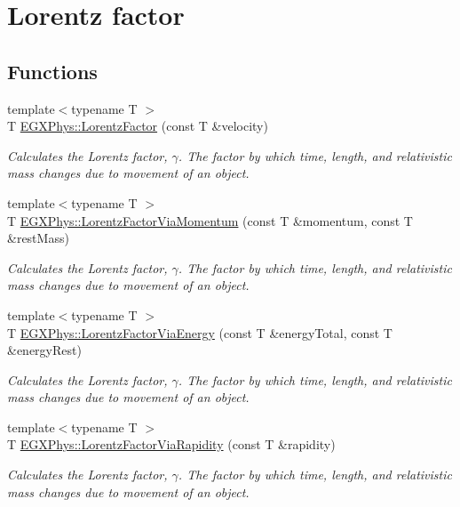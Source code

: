 \hypertarget{group___e_g_x_phys-_lorentz_factor}{}\section{Lorentz factor}
\label{group___e_g_x_phys-_lorentz_factor}
\subsection*{Functions}
\begin{DoxyCompactItemize}
\item 
{\footnotesize template$<$typename T $>$ }\\T \hyperlink{group___e_g_x_phys-_lorentz_factor_ga5f9b11c1f4c3ae26a7e64f02c22d5a75}{E\+G\+X\+Phys\+::\+Lorentz\+Factor} (const T \&velocity)
\begin{DoxyCompactList}\small\item\em Calculates the Lorentz factor, $\gamma$. The factor by which time, length, and relativistic mass changes due to movement of an object. \end{DoxyCompactList}\item 
{\footnotesize template$<$typename T $>$ }\\T \hyperlink{group___e_g_x_phys-_lorentz_factor_ga1ea24128654ac333dd843afdd5c003b7}{E\+G\+X\+Phys\+::\+Lorentz\+Factor\+Via\+Momentum} (const T \&momentum, const T \&rest\+Mass)
\begin{DoxyCompactList}\small\item\em Calculates the Lorentz factor, $\gamma$. The factor by which time, length, and relativistic mass changes due to movement of an object. \end{DoxyCompactList}\item 
{\footnotesize template$<$typename T $>$ }\\T \hyperlink{group___e_g_x_phys-_lorentz_factor_ga601de8c039be89a9abea22bc459436c9}{E\+G\+X\+Phys\+::\+Lorentz\+Factor\+Via\+Energy} (const T \&energy\+Total, const T \&energy\+Rest)
\begin{DoxyCompactList}\small\item\em Calculates the Lorentz factor, $\gamma$. The factor by which time, length, and relativistic mass changes due to movement of an object. \end{DoxyCompactList}\item 
{\footnotesize template$<$typename T $>$ }\\T \hyperlink{group___e_g_x_phys-_lorentz_factor_ga8064f5bce1d2ca5f7bc39d95ba4d2dd9}{E\+G\+X\+Phys\+::\+Lorentz\+Factor\+Via\+Rapidity} (const T \&rapidity)
\begin{DoxyCompactList}\small\item\em Calculates the Lorentz factor, $\gamma$. The factor by which time, length, and relativistic mass changes due to movement of an object. \end{DoxyCompactList}\end{DoxyCompactItemize}



